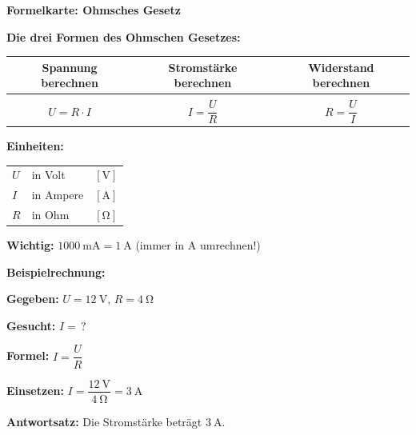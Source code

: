 \documentclass[11pt, a4paper]{article}
\begin{document}

\newpage

\begin{center}
    {\Large\textbf{\textcolor{physik}{Formelkarte: Ohmsches Gesetz}}}
\end{center}

\vspace{1em}

\begin{formelbox}
\begin{center}
\textbf{Die drei Formen des Ohmschen Gesetzes:}

\vspace{1em}

\begin{tabular}{|c|c|c|}
\hline
\textbf{Spannung berechnen} & \textbf{Stromstärke berechnen} & \textbf{Widerstand berechnen} \\[0.5em]
\hline
& & \\
{\LARGE $U = R \cdot I$} & {\LARGE $I = \dfrac{U}{R}$} & {\LARGE $R = \dfrac{U}{I}$} \\[1em]
\hline
\end{tabular}

\vspace{1.5em}

\textbf{Einheiten:}

\begin{tabular}{lll}
$U$ & in Volt & $[\si{\volt}]$ \\
$I$ & in Ampere & $[\si{\ampere}]$ \\
$R$ & in Ohm & $[\si{\ohm}]$ \\
\end{tabular}

\vspace{1em}

\textbf{Wichtig:} $\SI{1000}{\milli\ampere} = \SI{1}{\ampere}$ \quad (immer in A umrechnen!)

\end{center}
\end{formelbox}

\vspace{2em}

\begin{center}
\textbf{Beispielrechnung:}
\end{center}

\begin{tcolorbox}[colback=white, colframe=physik, boxrule=1pt, arc=0pt, title=\textbf{Beispiel: Stromstärke berechnen}]

\textbf{Gegeben:} $U = \SI{12}{\volt}$, \quad $R = \SI{4}{\ohm}$

\textbf{Gesucht:} $I = \,?$

\textbf{Formel:} $I = \dfrac{U}{R}$

\textbf{Einsetzen:} $I = \dfrac{\SI{12}{\volt}}{\SI{4}{\ohm}} = \SI{3}{\ampere}$

\textbf{Antwortsatz:} Die Stromstärke beträgt $\SI{3}{\ampere}$.

\end{tcolorbox}
\end{document}
